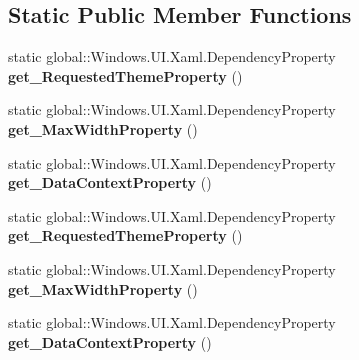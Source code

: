 \subsection*{Static Public Member Functions}
\begin{DoxyCompactItemize}
\item 
\mbox{\label{class_windows_1_1_u_i_1_1_xaml_1_1_framework_element_a3cdfe2f1cb8b9bedf69d8c72e8fb8773}} 
static global\+::\+Windows.\+U\+I.\+Xaml.\+Dependency\+Property {\bfseries get\+\_\+\+Requested\+Theme\+Property} ()
\item 
\mbox{\label{class_windows_1_1_u_i_1_1_xaml_1_1_framework_element_a7fe775b9e8b34c40bd7c3afc25f6fffb}} 
static global\+::\+Windows.\+U\+I.\+Xaml.\+Dependency\+Property {\bfseries get\+\_\+\+Max\+Width\+Property} ()
\item 
\mbox{\label{class_windows_1_1_u_i_1_1_xaml_1_1_framework_element_aa09001679b9cf376aa35ed86d7d75afd}} 
static global\+::\+Windows.\+U\+I.\+Xaml.\+Dependency\+Property {\bfseries get\+\_\+\+Data\+Context\+Property} ()
\item 
\mbox{\label{class_windows_1_1_u_i_1_1_xaml_1_1_framework_element_a3cdfe2f1cb8b9bedf69d8c72e8fb8773}} 
static global\+::\+Windows.\+U\+I.\+Xaml.\+Dependency\+Property {\bfseries get\+\_\+\+Requested\+Theme\+Property} ()
\item 
\mbox{\label{class_windows_1_1_u_i_1_1_xaml_1_1_framework_element_a7fe775b9e8b34c40bd7c3afc25f6fffb}} 
static global\+::\+Windows.\+U\+I.\+Xaml.\+Dependency\+Property {\bfseries get\+\_\+\+Max\+Width\+Property} ()
\item 
\mbox{\label{class_windows_1_1_u_i_1_1_xaml_1_1_framework_element_aa09001679b9cf376aa35ed86d7d75afd}} 
static global\+::\+Windows.\+U\+I.\+Xaml.\+Dependency\+Property {\bfseries get\+\_\+\+Data\+Context\+Property} ()
\item 
\mbox{\label{class_windows_1_1_u_i_1_1_xaml_1_1_framework_element_a3cdfe2f1cb8b9bedf69d8c72e8fb8773}} 

\end{DoxyCompactItemize}
